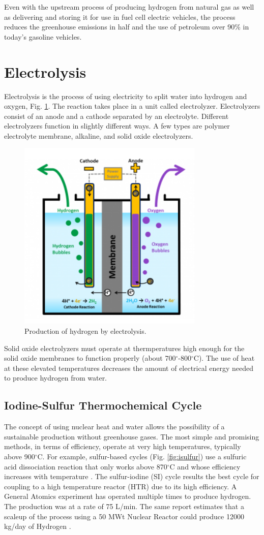 \documentclass{anstrans}
\begin{document}
Even with the upstream process of producing hydrogen from natural gas as well as delivering and storing it for use in fuel cell electric vehicles, the process reduces the greenhouse emissions in half and the use of petroleum over 90\% in today's gasoline vehicles.

\section{Electrolysis}

Electrolysis is the process of using electricity to split water into hydrogen and oxygen, Fig. \ref{fig:electro}. The reaction takes place in a unit called electrolyzer. Electrolyzers consist of an anode and a cathode separated by an electrolyte. Different electrolyzers function in slightly different ways. A few types are polymer electrolyte membrane, alkaline, and solid oxide electrolyzers.

\begin{figure}[]
	\centering
	\includegraphics[width=0.4\linewidth]{figures/electrolysis.png}
	\hfill
	\caption{Production of hydrogen by electrolysis.}
	\label{fig:electro}
\end{figure}

Solid oxide electrolyzers must operate at thermperatures high enough for the solid oxide membranes to function properly (about 700$^{\circ}$-800$^{\circ}$C). The use of heat at these elevated temperatures decreases the amount of electrical energy needed to produce hydrogen from water.

\subsection{Iodine-Sulfur Thermochemical Cycle}

The concept of using nuclear heat and water allows the possibility of a sustainable production without greenhouse gases. The most simple and promising methods, in terms of efficiency, operate at very high temperatures, typically above 900$^{\circ}$C. For example, sulfur-based cycles (Fig. \ref{fig:isulfur}) use a sulfuric acid dissociation reaction that only works above 870$^{\circ}$C and whose efficiency increases with temperature \cite{cea_gas-cooled_2006}. The sulfur-iodine (SI) cycle results the best cycle for coupling to a high temperature reactor (HTR) due to its high efficiency. A General Atomics experiment has operated multiple times to produce hydrogen. The production was at a rate of 75 L/min. The same report estimates that a scaleup of the process using a 50 MWt Nuclear Reactor could produce 12000 kg/day of Hydrogen \cite{benjamin_russ_sulfur_2009}.
\end{document}
